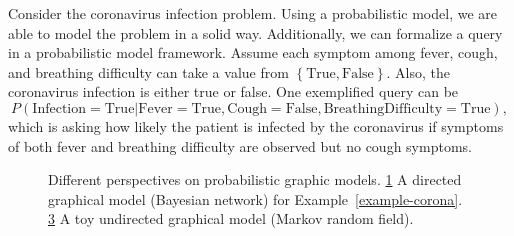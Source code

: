 \begin{example}\label{example-corona}
  Consider the coronavirus infection problem. Using a probabilistic model, we are able to model the problem in a solid way. Additionally, we can formalize a query in a probabilistic model framework. Assume each symptom among fever, cough, and breathing difficulty can take a value from $\left\{ \mathrm{True}, \mathrm{False} \right\}$. Also, the coronavirus infection is either true or false. One exemplified query can be
  \begin{equation}
    P(\mathrm{Infection} = \mathrm{True} | \mathrm{Fever} = \mathrm{True}, \mathrm{Cough} = \mathrm{False}, \mathrm{Breathing Difficulty}= \mathrm{True}), \nonumber
  \end{equation}
  which is asking how likely the patient is infected by the coronavirus if symptoms of both fever and breathing difficulty are observed but no cough symptoms.

\end{example}

\begin{figure}[!t]
  \begin{subfigure}{.4\textwidth}
    \caption{}
    \label{fig:dag-coronavirus}
  \end{subfigure}\hspace{2.5cm}
  \begin{subfigure}{0.3\textwidth}
    \caption{}
    \label{fig:mrf-communication}
  \end{subfigure}
  \caption{Different perspectives on probabilistic graphic models. \ref{fig:dag-coronavirus} A directed graphical model (Bayesian network) for Example~\ref{example-corona}. \ref{fig:mrf-communication} A toy undirected graphical model (Markov random field).}
\end{figure}


